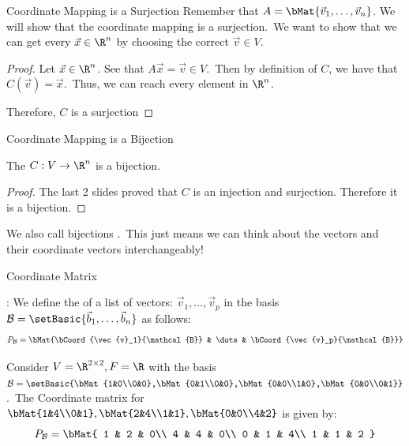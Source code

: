 \documentclass[xcoler=dvipsnames, aspectratio=169]{beamer}
\newcommand{\B}{\mathcal{B}}
\begin{document}
    \begin{frame}{Coordinate Mapping is a Surjection}
        Remember that $A = \bMat{\vec{v}_1,\dots,\vec{v}_n}$. We will show that the coordinate mapping
        is a surjection.\pause\
        We want to show that we can get every $\vec{x}\in\R^n$ by choosing the correct $\vec{v}\in V$.\pause
        \begin{proof}
            Let $\vec{x}\in\R^n$. See that $A\vec{x} = \vec{v}\in V$.\pause\
            Then by definition of $C$, we have that $C(\vec{v}) = \vec{x}$.\pause\ Thus, we can reach every element in $\R^n$.\pause

            Therefore, $C$ is a surjection
        \end{proof}
    \end{frame}
    \begin{frame}{Coordinate Mapping is a Bijection}
        \begin{theorem}
            The \bText{coordinate mapping} $C:V\rightarrow\R^n$ is a bijection.
        \end{theorem}\pause
        \begin{proof}
            The last 2 slides proved that $C$ is an injection and surjection. Therefore it is a
            bijection.
        \end{proof}\pause
        \vspace{60pt}
        \begin{tcolorbox}
            We also call bijections .\pause\ This just means we can think about
            the vectors and their coordinate vectors interchangeably!
        \end{tcolorbox}
    \end{frame}
    \begin{frame}{Coordinate Matrix}
        \small
        \begin{defn}
            : We define the  of a list of
            vectors: $\vec{v}_1,\dots,\vec{v}_p$ in the basis $\B=\setBasic{\vec{b}_1,\dots,\vec{b}_n}$
            as follows:
            \[
                P_\B = \bMat{\bCoord{\vec{v}_1}{\B} & \dots & \bCoord{\vec{v}_p}{\B}}
            \]
        \end{defn}\pause
        \begin{example}
            Consider $V=\R^{2\times 2},F=\R$ with the basis
            $\B=\setBasic{\bMat{1&0\\0&0},\bMat{0&1\\0&0},\bMat{0&0\\1&0},\bMat{0&0\\0&1}}$.\pause\
            The Coordinate matrix for $\bMat{1&4\\0&1},\bMat{2&4\\1&1},\bMat{0&0\\4&2}$ is given by:\pause\
            \[
                P_\B = \bMat{
                    1 & 2 & 0\\
                    4 & 4 & 0\\
                    0 & 1 & 4\\
                    1 & 1 & 2
                }
            \]
        \end{example}
    \end{frame}
\end{document}
